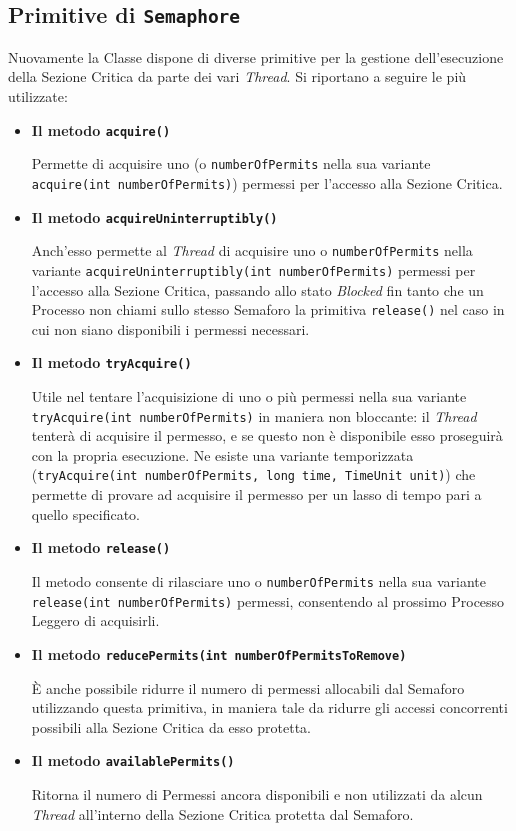 \subsection{Primitive di \texttt{Semaphore}}
Nuovamente la Classe dispone di diverse primitive per la gestione dell'esecuzione della Sezione Critica da parte dei vari \textit{Thread}. Si riportano a seguire le più utilizzate:
\begin{itemize}
    \item \textbf{Il metodo \texttt{acquire()}} \par
    Permette di acquisire uno (o \texttt{numberOfPermits} nella sua variante \texttt{acquire(int numberOfPermits)}) permessi per l'accesso alla Sezione Critica.
    \item \textbf{Il metodo \texttt{acquireUninterruptibly()}} \par
    Anch'esso permette al \textit{Thread} di acquisire uno o \texttt{numberOfPermits} nella variante \texttt{acquireUninterruptibly(int numberOfPermits)} permessi per l'accesso alla Sezione Critica, passando allo stato \textit{Blocked} fin tanto che un Processo non chiami sullo stesso Semaforo la primitiva \texttt{release()} nel caso in cui non siano disponibili i permessi necessari.
    \item \textbf{Il metodo \texttt{tryAcquire()}} \par
    Utile nel tentare l'acquisizione di uno o più permessi nella sua variante \texttt{tryAcquire(int numberOfPermits)} in maniera non bloccante: il \textit{Thread} tenterà di acquisire il permesso, e se questo non è disponibile esso proseguirà con la propria esecuzione. Ne esiste una variante temporizzata (\texttt{tryAcquire(int numberOfPermits, long time, TimeUnit unit)}) che permette di provare ad acquisire il permesso per un lasso di tempo pari a quello specificato.
    \item \textbf{Il metodo \texttt{release()}} \par
    Il metodo consente di rilasciare uno o \texttt{numberOfPermits} nella sua variante \texttt{release(int numberOfPermits)} permessi, consentendo al prossimo Processo Leggero di acquisirli.
    \item \textbf{Il metodo \texttt{reducePermits(int numberOfPermitsToRemove)}} \par
    È anche possibile ridurre il numero di permessi allocabili dal Semaforo utilizzando questa primitiva, in maniera tale da ridurre gli accessi concorrenti possibili alla Sezione Critica da esso protetta.
    \item \textbf{Il metodo \texttt{availablePermits()}} \par
    Ritorna il numero di Permessi ancora disponibili e non utilizzati da alcun \textit{Thread} all'interno della Sezione Critica protetta dal Semaforo.
\end{itemize}
